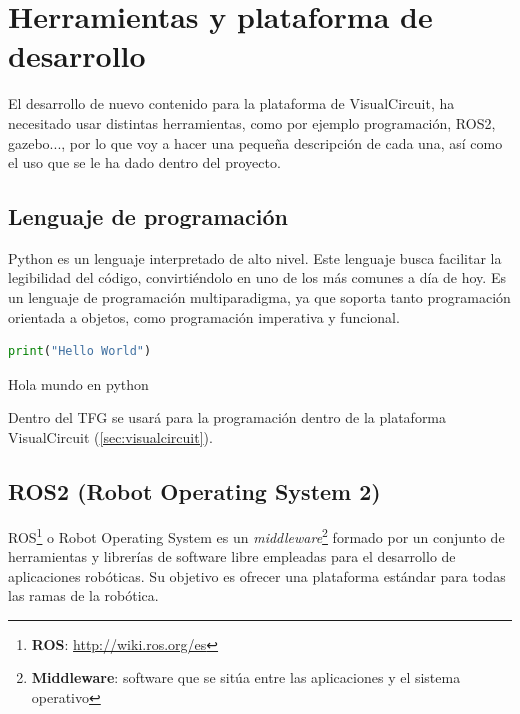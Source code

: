 \chapter{Herramientas y plataforma de desarrollo}
\label{cap:capitulo3}

El desarrollo de nuevo contenido para la plataforma de VisualCircuit, ha necesitado usar distintas herramientas, como por ejemplo programación,
ROS2, gazebo..., por lo que voy a hacer una pequeña descripción de cada una, así como el uso que se le ha dado dentro del proyecto.

\section{Lenguaje de programación}
\label{sec:lenguaje_programación}

Python es un lenguaje interpretado de alto nivel. Este lenguaje busca facilitar la legibilidad del código, convirtiéndolo en uno de los más comunes a día de hoy.
Es un lenguaje de programación multiparadigma, ya que soporta tanto programación orientada a objetos, como programación imperativa y funcional.\\

\begin{code}[H]
    \begin{lstlisting}[language=python]
    print("Hello World")
    \end{lstlisting}
    \caption[Hola mundo en python]{Hola mundo en python}
    \label{cod:holamundo_python}
\end{code}

Dentro del TFG se usará para la programación dentro de la plataforma VisualCircuit (\ref{sec:visualcircuit}).

\section{ROS2 (Robot Operating System 2)}
\label{sec:ros2}

ROS\footnote{\textbf{ROS}: \url{http://wiki.ros.org/es}} o Robot Operating System es un
\textit{middleware}\footnote{{\textbf{Middleware}: software que se sitúa entre las aplicaciones y el sistema operativo}} formado
por un conjunto de herramientas y librerías de software libre empleadas para el desarrollo de aplicaciones robóticas.
Su objetivo es ofrecer una plataforma estándar para todas las ramas de la robótica.\\

